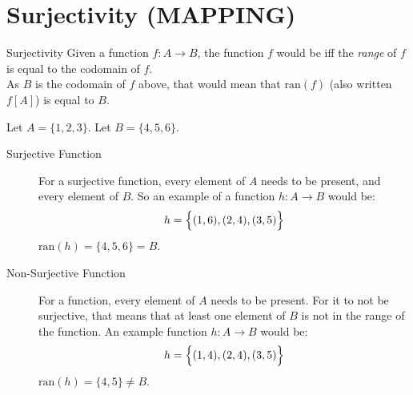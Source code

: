 \documentclass[../notes.tex]{subfiles}
\begin{document}
		\section[Surjectivity]{Surjectivity (MAPPING)}
			\begin{definition}{Surjectivity}
				Given a function $f: A \rightarrow B$, the function $f$ would be  iff the \emph{range} of $f$ is equal to the codomain of $f$.\\
				As $B$ is the codomain of $f$ above, that would mean that $\mathrm{ran}(f)$ (also written $f[A]$) is equal to $B$.
			\end{definition}
			\begin{example}
				Let $A = \{1, 2, 3\}$. Let $B = \{4, 5, 6\}$.
				\begin{description}
					\item[Surjective Function] For a surjective function, every element of $A$ needs to be present, and every element of $B$. So an example of a function $h: A \rightarrow B$ would be:
						\begin{align*}
							h = \Bigl\{(1, 6), (2, 4), (3, 5)\Bigr\}
						\end{align*}
						$\mathrm{ran}(h) = \{4, 5, 6\} = B$.
					\item[Non-Surjective Function] For a function, every element of $A$ needs to be present. For it to not be surjective, that means that at least one element of $B$ is not in the range of the function. An example function $h: A \rightarrow B$ would be:
						\begin{align*}
							h = \Bigl\{(1, 4), (2, 4), (3, 5)\Bigr\}
						\end{align*}
						$\mathrm{ran}(h) = \{4, 5\} \neq B$.
				\end{description}
			\end{example}
\end{document}
